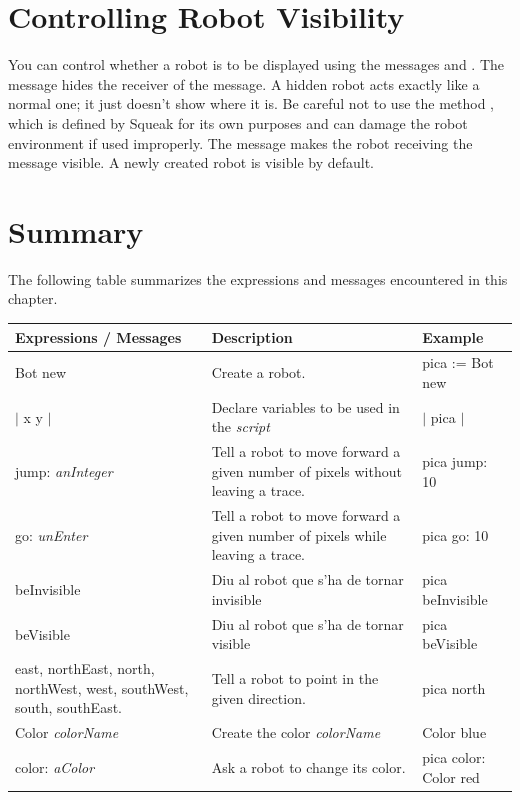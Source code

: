 \documentclass[a4paper,10pt,twoside]{book}
\begin{document}
	
\section{Controlling Robot Visibility}

You can control whether a robot is to be displayed using the messages  and 
. The message  hides the receiver of the message. A hidden robot acts 
exactly like a normal one; it just doesn’t show where it is. Be careful not to use the method 
, which is defined by Squeak for its own purposes and can damage the robot environment 
if used improperly. The message  makes the robot receiving the message visible. 
A newly created robot is visible by default. 

\section{Summary}

The following table summarizes the expressions and messages encountered in this chapter. 

\noindent
\setlength{\extrarowheight}{1mm}
{\small \begin{tabular}{p{30mm}p{50mm}p{30mm}}
\hline
\textbf{Expressions / Messages}&\textbf{Description}&\textbf{Example}\\\hline
\textsf{Bot new}&Create a robot. &\textsf{pica := Bot new}\\
\textsf{$|$ x y $|$}
&
Declare variables to be used in the \emph{script}
&
\textsf{$|$ pica $|$}
\\
\textsf{jump: {\itshape anInteger}}
&

Tell a robot to move forward a
given number of pixels without 
leaving a trace. 

&
\textsf{pica jump: 10}
\\
\textsf{go: {\itshape unEnter}}
&

Tell a robot to move forward a
given number of pixels while 
leaving a trace. 

&
\textsf{pica go: 10}
\\
\textsf{beInvisible}
&
Diu al robot que s'ha de tornar invisible
&
\textsf{pica beInvisible}
\\
\textsf{beVisible}
&
Diu al robot que s'ha de tornar visible
&
\textsf{pica beVisible}
\\
\textsf{east, northEast, north, northWest, west, southWest, south, southEast.}
&

Tell a robot to point in the
given direction. 

&
\textsf{pica north}
\\
\textsf{Color {\itshape colorName}}
&
Create the color \textit{colorName}
&
\textsf{Color blue}
\\
\textsf{color: {\itshape aColor}}
&
Ask a robot to change its color.
&
\textsf{pica color: Color red}
\\
\hline
\end{tabular}}


	
\ifx\wholebook\relax\else
    
\end{document}
